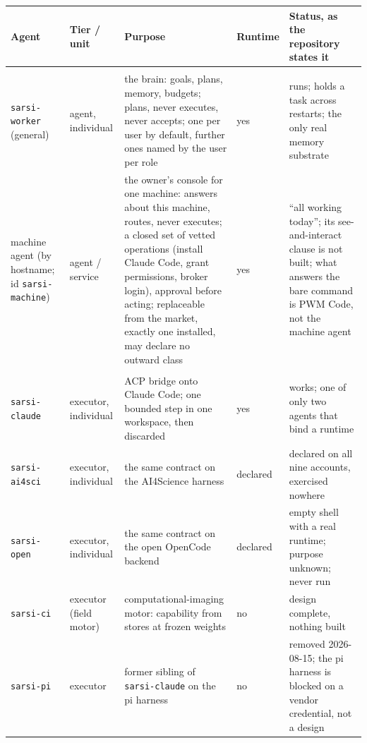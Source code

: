\begin{table}[!htbp]
\centering\scriptsize
\begin{tabularx}{\textwidth}{@{}>{\raggedright\arraybackslash}p{3.6cm}>{\raggedright\arraybackslash}p{1.7cm}Y>{\raggedright\arraybackslash}p{1.2cm}>{\raggedright\arraybackslash}p{2.9cm}@{}}
\toprule
Agent & Tier / unit & Purpose & Runtime & Status, as the repository states it \\
\midrule
{} \\
\texttt{sarsi-worker} (general) & agent, individual & the brain: goals, plans, memory, budgets; plans, never executes, never accepts; one per user by default, further ones named by the user per role & yes & runs; holds a task across restarts; the only real memory substrate \\
machine agent (by hostname; id \texttt{sarsi-machine}) & agent / service & the owner's console for one machine: answers about this machine, routes, never executes; a closed set of vetted operations (install Claude Code, grant permissions, broker login), approval before acting; replaceable from the market, exactly one installed, may declare no outward class & yes & ``all working today''; its see-and-interact clause is not built; what answers the bare command is PWM Code, not the machine agent \\
\midrule
{} \\
\texttt{sarsi-claude} & executor, individual & ACP bridge onto Claude Code; one bounded step in one workspace, then discarded & yes & works; one of only two agents that bind a runtime \\
\texttt{sarsi-ai4sci} & executor, individual & the same contract on the AI4Science harness & declared & declared on all nine accounts, exercised nowhere \\
\texttt{sarsi-open} & executor, individual & the same contract on the open OpenCode backend & declared & empty shell with a real runtime; purpose unknown; never run \\
\texttt{sarsi-ci} & executor (field motor) & computational-imaging motor: capability from stores at frozen weights & no & design complete, nothing built \\
\texttt{sarsi-pi} & executor & former sibling of \texttt{sarsi-claude} on the pi harness & no & removed 2026-08-15; the pi harness is blocked on a vendor credential, not a design \\

\end{tabularx}
\end{table}
